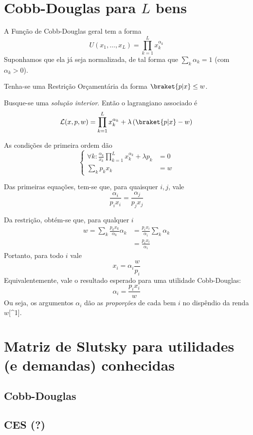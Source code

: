 \documentclass[12pt]{article}
\title{}
\author{}
\date{}
\numberwithin{equation}{section}
\theoremstyle{plain}
\theoremstyle{definition}
\theoremstyle{remark}
\begin{document}
\maketitle

\hypertarget{cobb-douglas-para-l-bens}{%
\section{\texorpdfstring{Cobb-Douglas para \(L\)
bens}{Cobb-Douglas para L bens}}\label{cobb-douglas-para-l-bens}}

A Função de Cobb-Douglas geral tem a forma \[
U(x_{1},\dots,x_{L}) = \prod \limits_{k=1}^{L} x_{k}^{\alpha_{k}}
\] Suponhamos que ela já seja normalizada, de tal forma que
\(\sum_{k} \alpha_{k} = 1\) (com \(\alpha_{k} > 0\)).

Tenha-se uma Restrição Orçamentária da forma
\(\braket{ p | x } \leq w\).

Busque-se uma \textit{solução interior}. Então o lagrangiano associado é
\[
\mathcal{L}(x, p, w) = \prod \limits_{k=1}^{L} x_{k}^{\alpha_{k}} + \lambda \left(\braket{ p | x } - w\right)
\]

As condições de primeira ordem dão \[
\begin{cases}
\forall k: \frac{\alpha_{k}}{x_{k}} \prod \limits_{k=1}^{L} x_{k}^{\alpha_{k}}  + \lambda p_{k} &= 0\\
\sum \limits_{k} p_{k} x_{k} &= w
\end{cases}
\]

Das primeiras equações, tem-se que, para quaisquer \(i, j\), vale \[
\frac{\alpha_{i}}{p_{i} x_{i}} = \frac{\alpha_{j}}{p_{j} x_{j}}
\]

Da restrição, obtém-se que, para qualquer \(i\) \[
\begin{align}
w = \sum\limits_{k} \frac{p_{k} x_{k}}{\alpha_{k}} \alpha_{k} &= \frac{p_{i} x_{i}}{\alpha_{i}} \sum \limits_{k} \alpha_{k}  \\
&= \frac{p_{i} x_{i}}{\alpha_{i}}
\end{align}
\] Portanto, para todo \(i\) vale \[
x_{i} = \alpha_{i} \frac{w}{p_{i}}
\] Equivalentemente, vale o resultado esperado para uma utilidade
Cobb-Douglas: \[
\alpha_{i} = \frac{p_{i} x_{i}}{w}
\] Ou seja, os argumentos \(\alpha_{i}\) dão as \textit{proporções} de
cada bem \(i\) no dispêndio da renda \(w\){[}\^{}1{]}.

\hypertarget{matriz-de-slutsky-para-utilidades-e-demandas-conhecidas}{%
\section{Matriz de Slutsky para utilidades (e demandas)
conhecidas}\label{matriz-de-slutsky-para-utilidades-e-demandas-conhecidas}}

\hypertarget{cobb-douglas}{%
\subsection{Cobb-Douglas}\label{cobb-douglas}}

\hypertarget{ces}{%
\subsection{CES (?)}\label{ces}}

\printbibliography
\end{document}
